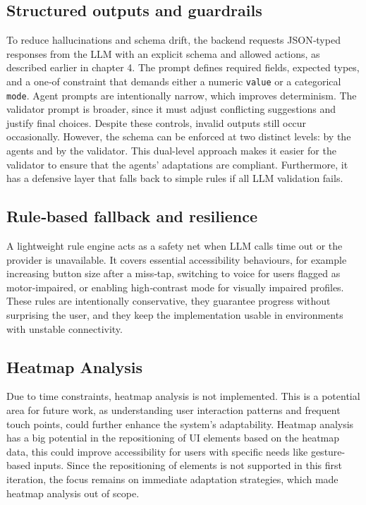 \documentclass[openany]{book}
\begin{document}
\subsection{Structured outputs and guardrails}
To reduce hallucinations and schema drift, the backend requests JSON‑typed responses from the LLM with an explicit schema and allowed actions, as described earlier in chapter 4. The prompt defines required fields, expected types, and a one‑of constraint that demands either a numeric \texttt{value} or a categorical \texttt{mode}. Agent prompts are intentionally narrow, which improves determinism. The validator prompt is broader, since it must adjust conflicting suggestions and justify final choices. Despite these controls, invalid outputs still occur occasionally. However, the schema can be enforced at two distinct levels: by the agents and by the validator. This dual-level approach makes it easier for the validator to ensure that the agents' adaptations are compliant. Furthermore, it has a defensive layer that falls back to simple rules if all LLM validation fails.

\subsection{Rule‑based fallback and resilience}
A lightweight rule engine acts as a safety net when LLM calls time out or the provider is unavailable. It covers essential accessibility behaviours, for example increasing button size after a miss‑tap, switching to voice for users flagged as motor‑impaired, or enabling high‑contrast mode for visually impaired profiles. These rules are intentionally conservative, they guarantee progress without surprising the user, and they keep the implementation usable in environments with unstable connectivity.

\subsection{Heatmap Analysis}
Due to time constraints, heatmap analysis is not implemented. This is a potential area for future work, as understanding user interaction patterns and frequent touch points, could further enhance the system's adaptability. Heatmap analysis has a big potential in the repositioning of UI elements based on the heatmap data, this could improve accessibility for users with specific needs like gesture-based inputs. Since the repositioning of elements is not supported in this first iteration, the focus remains on immediate adaptation strategies, which made heatmap analysis out of scope.
\end{document}
